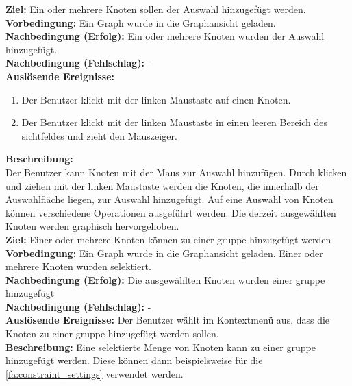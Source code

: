 \label{fa:selekt_knoten}
\textbf{Ziel:} Ein oder mehrere Knoten sollen der Auswahl hinzugefügt werden.\\
\textbf{Vorbedingung:} Ein Graph wurde in die Graphansicht geladen.\\
\textbf{Nachbedingung (Erfolg):} Ein oder mehrere Knoten wurden der Auswahl hinzugefügt.\\
\textbf{Nachbedingung (Fehlschlag):} -\\
\textbf{Auslösende Ereignisse:}
\begin{enumerate}[nolistsep, label=(\alph*)]
  \item Der Benutzer klickt mit der linken Maustaste auf einen Knoten.
  \item Der Benutzer klickt mit der linken Maustaste in einen leeren Bereich des \gls{sichtfeld}es und zieht den Mauszeiger.
\end{enumerate}
\textbf{Beschreibung:}\\
Der Benutzer kann Knoten mit der Maus zur Auswahl hinzufügen. Durch klicken und ziehen mit der linken Maustaste werden die Knoten, die innerhalb der Auswahlfläche liegen, zur Auswahl hinzugefügt.
Auf eine Auswahl von Knoten können verschiedene Operationen ausgeführt werden. %
Die derzeit ausgewählten Knoten werden graphisch hervorgehoben.\\

\label{fa:gruppe}
\textbf{Ziel:} Einer oder mehrere Knoten können zu einer \gls{gruppe} hinzugefügt werden \\
\textbf{Vorbedingung:} Ein Graph wurde in die Graphansicht geladen. Einer oder mehrere Knoten wurden selektiert. \\
\textbf{Nachbedingung (Erfolg):} Die ausgewählten Knoten wurden einer \gls{gruppe} hinzugefügt \\
\textbf{Nachbedingung (Fehlschlag):} - \\
\textbf{Auslösende Ereignisse:} Der Benutzer wählt im Kontextmenü aus, dass die Knoten zu einer \gls{gruppe} hinzugefügt werden sollen. \\
\textbf{Beschreibung:} Eine selektierte Menge von Knoten kann zu einer \gls{gruppe} hinzugefügt werden. Diese können dann beispielsweise für die \ref{fa:constraint_settings} verwendet werden.\\

